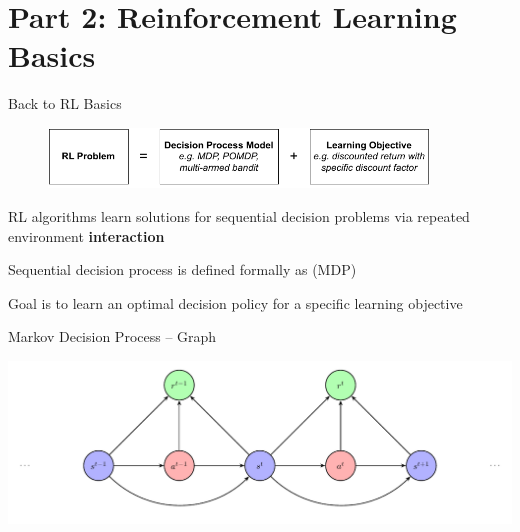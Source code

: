 \section{Part 2: Reinforcement Learning Basics}


\begin{frame}{Back to RL Basics}

    \begin{figure}
        \centering
        \includegraphics[width=0.9\textwidth]{images/chapter_2/rl-learning-problem.pdf}
    \end{figure}

    \blist
        \item RL algorithms learn solutions for sequential decision problems via repeated environment \textbf{interaction}
        \item Sequential decision process is defined formally as  (MDP)
        \item Goal is to learn an optimal decision policy for a specific learning objective
    \elist
    
\end{frame}

\begin{frame}{Markov Decision Process -- Graph}
    
      \centering
      \includegraphics[width=1\textwidth]{images/1_mdp_diagram_elipses.pdf}
    
\end{frame}

